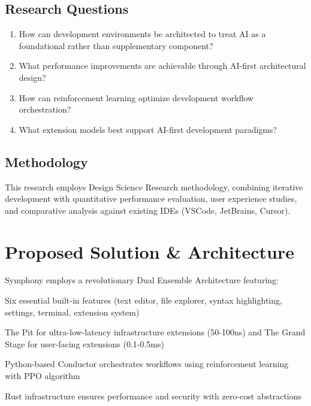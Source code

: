\subsection*{Research Questions}
\begin{enumerate}
    \item How can development environments be architected to treat AI as a foundational rather than supplementary component?
    \item What performance improvements are achievable through AI-first architectural design?
    \item How can reinforcement learning optimize development workflow orchestration?
    \item What extension models best support AI-first development paradigms?
\end{enumerate}

\subsection*{Methodology}
This research employs Design Science Research methodology, combining iterative development with quantitative performance evaluation, user experience studies, and comparative analysis against existing IDEs (VSCode, JetBrains, Cursor).

\section*{Proposed Solution \& Architecture}

Symphony employs a revolutionary Dual Ensemble Architecture featuring:

\begin{description}[leftmargin=3cm,labelwidth=2.5cm]
    \item[\textbf{Minimal Core}] Six essential built-in features (text editor, file explorer, syntax highlighting, settings, terminal, extension system)
    \item[\textbf{Dual Execution}] The Pit for ultra-low-latency infrastructure extensions (50-100ns) and The Grand Stage for user-facing extensions (0.1-0.5ms)
    \item[\textbf{AI Orchestration}] Python-based Conductor orchestrates workflows using reinforcement learning with PPO algorithm
    \item[\textbf{Memory Safety}] Rust infrastructure ensures performance and security with zero-cost abstractions
\end{description}

